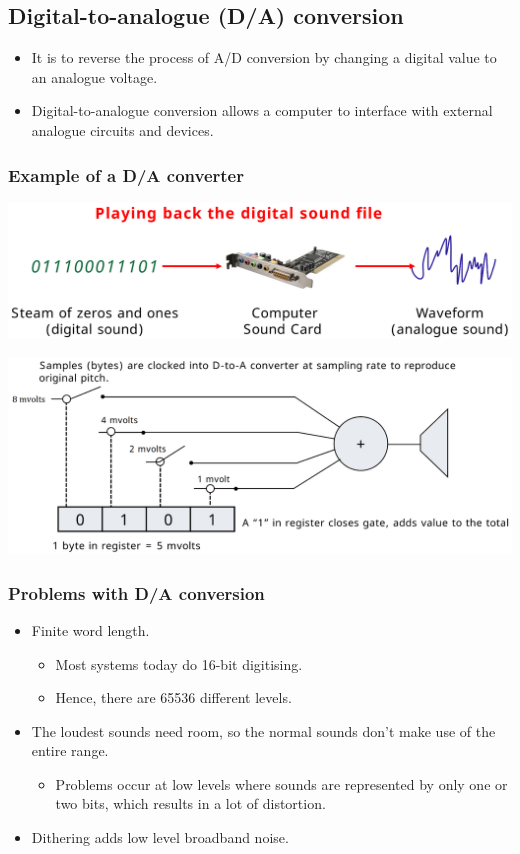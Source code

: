 \documentclass[11pt]{article}
\begin{document}
\subsection{Digital-to-analogue (D/A) conversion}
\label{sec:org9eb394f}
\begin{itemize}
\item It is to reverse the process of A/D conversion by changing a digital value to an analogue voltage.
\item Digital-to-analogue conversion allows a computer to interface with external analogue circuits and devices.
\end{itemize}
\subsubsection{Example of a D/A converter}
\label{sec:orgf0d5296}
\begin{center}
\includegraphics[width=.9\linewidth]{./images/playing-back-the-digital-sound-file.png}
\end{center}

\begin{center}
\includegraphics[width=.9\linewidth]{./images/digital-to-analogue-converter-diagram.png}
\end{center}
\subsubsection{Problems with D/A conversion}
\label{sec:orgcf39050}
\begin{itemize}
\item Finite word length.
\begin{itemize}
\item Most systems today do 16-bit digitising.
\item Hence, there are 65536 different levels.
\end{itemize}
\item The loudest sounds need room, so the normal sounds don't make use of the entire range.
\begin{itemize}
\item Problems occur at low levels where sounds are represented by only one or two bits, which results in a lot of distortion.
\end{itemize}
\item Dithering adds low level broadband noise.
\end{itemize}
\end{document}
